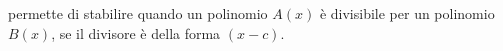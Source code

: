 permette di stabilire quando un polinomio $A(x)$ è divisibile 
per un polinomio $B(x)$, se il divisore è della forma $(x-c)$. %
